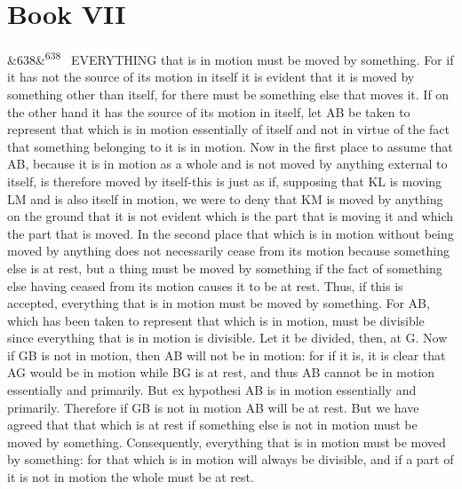 \documentclass[12pt]{article}
\newcommand{\para}[1][]{\par\noindent\ifx&#1&\else\textsuperscript{\footnotesize #1}~\fi}
\begin{document}
\section*{Book VII}

\para[638] EVERYTHING that is in motion must be moved by something. For if it has not the source of its motion in itself it is evident that it is moved by something other than itself, for there must be something else that moves it. If on the other hand it has the source of its motion in itself, let AB be taken to represent that which is in motion essentially of itself and not in virtue of the fact that something belonging to it is in motion. Now in the first place to assume that AB, because it is in motion as a whole and is not moved by anything external to itself, is therefore moved by itself-this is just as if, supposing that KL is moving LM and is also itself in motion, we were to deny that KM is moved by anything on the ground that it is not evident which is the part that is moving it and which the part that is moved. In the second place that which is in motion without being moved by anything does not necessarily cease from its motion because something else is at rest, but a thing must be moved by something if the fact of something else having ceased from its motion causes it to be at rest. Thus, if this is accepted, everything that is in motion must be moved by something. For AB, which has been taken to represent that which is in motion, must be divisible since everything that is in motion is divisible. Let it be divided, then, at G. Now if GB is not in motion, then AB will not be in motion: for if it is, it is clear that AG would be in motion while BG is at rest, and thus AB cannot be in motion essentially and primarily. But ex hypothesi AB is in motion essentially and primarily. Therefore if GB is not in motion AB will be at rest. But we have agreed that that which is at rest if something else is not in motion must be moved by something. Consequently, everything that is in motion must be moved by something: for that which is in motion will always be divisible, and if a part of it is not in motion the whole must be at rest.
\end{document}
